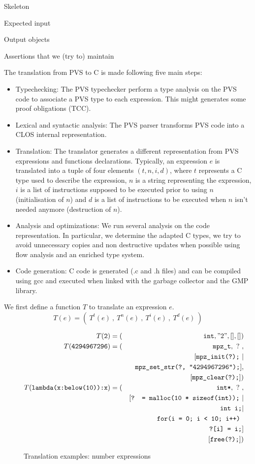 \documentclass[12pt,a4paper,titlepage]{article}
\newcommand{\cl}[1]{\texttt{#1}}
\begin{document}
Skeleton

Expected input

Output objects

Assertions that we (try to) maintain


The translation from PVS to C is made following five main steps:
\begin{itemize}
\item Typechecking: The PVS typechecker perform a type analysis on the PVS code to associate a PVS type to each expression. This might generates some proof obligations (TCC).
\item Lexical and syntactic analysis: The PVS parser transforms PVS code into a CLOS internal representation.
\item Translation: The translator generates a different representation from PVS expressions and functions declarations.
Typically, an expression $e$ is translated into a tuple of four elements $(t,n,i,d)$, where $t$ represents a C type used to describe the expression, $n$ is a string representing the expression, $i$ is a list of instructions supposed to be executed prior to using $n$ (initialisation of $n$) and $d$ is a list of instructions to be executed when $n$ isn't needed anymore (destruction of $n$).
\item Analysis and optimizations: We run several analysis on the code representation. In particular, we determine the adapted C types, we try to avoid unnecessary copies and non destructive updates when possible using flow analysis and an enriched type system.
\item Code generation: C code is generated (.c and .h files) and can be compiled using gcc and executed when linked with the garbage collector and the GMP library. 
\end{itemize}

We first define a function $T$ to translate an expression $e$.
$$ T(e) = ( \ T^t(e) \ , \ T^n(e) \ , \ T^i(e) \ , \ T^d(e) \ ) $$

\begin{figure}[!ht]
\begin{eqnarray*}
T(\cl{2}) &= (& \cl{int}, "2", [], []) \\
T(\cl{4294967296}) &= (& \cl{mpz\_t}, \ ? \ , \\
&& [ \cl{mpz\_init(?);} \ | \\
&& \ \cl{mpz\_set\_str(?, "4294967296");} ],\\
&& [ \cl{mpz\_clear(?);} ]) \\
T(\cl{lambda(x:below(10)):x}) &= (& \cl{int*}, \ ? \ , \\
&& [ \cl{? = malloc(10 * sizeof(int));} \ | \\
&& \ \cl{int i;} | \\
&& \ \cl{for(i = 0; i < 10; i++) }\\
&& \ \ \ \cl{?[i] = i;}  ]\\
&& [ \cl{free(?);} ])
\end{eqnarray*}
\caption{Translation examples: number expressions}
\end{figure}
\end{document}
